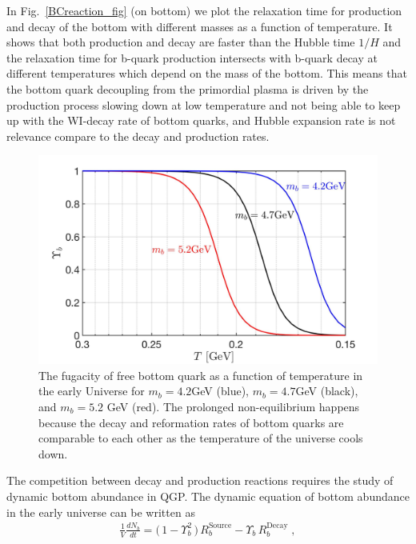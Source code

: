 \documentclass[universe,article,submit,moreauthors,pdftex,a4paper]{Definitions/mdpi}
\begin{document}
In Fig.~\ref{BCreaction_fig} (on bottom) we plot the relaxation time for production and decay of the bottom with different masses as a function of temperature. It shows that both production and decay are faster than the Hubble time $1/H$ and the relaxation time for b-quark production intersects with b-quark decay at different temperatures which depend on the mass of the bottom. This means that the bottom quark decoupling from the primordial plasma is driven by the production process slowing down at low temperature and not being able to keep up with the WI-decay rate of bottom quarks, and Hubble expansion rate is not relevance compare to the decay and production rates.
\begin{figure} [t]
\centering
\includegraphics[width=\textwidth]{./plots/BquarkFugacity.jpg}
\caption{The fugacity of free bottom quark as a function of temperature in the early Universe for $m_b = 4.2$GeV (blue), $m_b = 4.7 $GeV (black), and $m_b = 5.2$ GeV (red). The prolonged non-equilibrium happens because the decay and reformation rates of bottom quarks are comparable to each other as the temperature of the universe cools down. }
\label{UpsilonBottom_fig}
\end{figure}
The competition between decay and production reactions requires the study of dynamic bottom abundance in QGP. The dynamic equation of bottom abundance in the early universe can be written as
\begin{align}
\label{Bquark_eq}
\frac{1}{V}\frac{dN_b}{dt}=\big(\,1-\Upsilon^2_{b}\,\big)\,R^{\mathrm{Source}}_{b}-\Upsilon_b\,R^{\mathrm{Decay}}_{b}\;,
\end{align}
\end{document}
